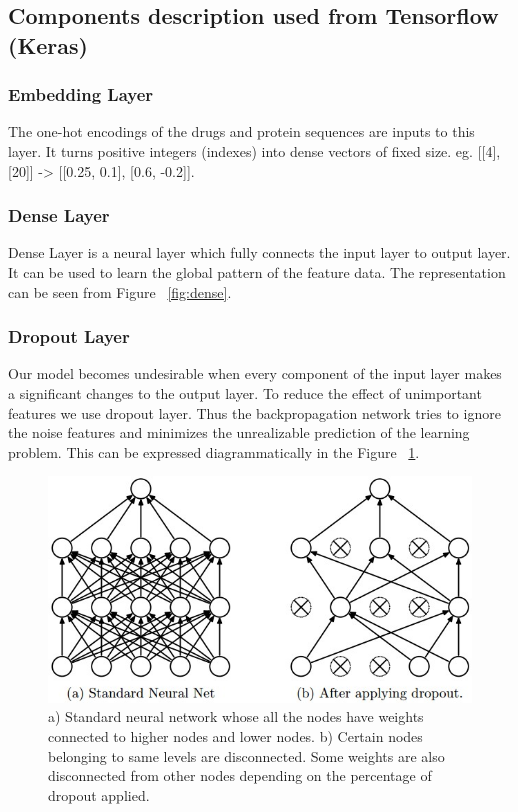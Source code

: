   \subsection{Components description used from Tensorflow (Keras)}
  \subsubsection{Embedding Layer}
  The one-hot encodings of the drugs and protein sequences are inputs to this layer. It turns positive integers (indexes) into dense vectors of fixed size. eg. [[4], [20]] -> [[0.25, 0.1], [0.6, -0.2]].
  
  \subsubsection{Dense Layer}
  Dense Layer is a neural layer which fully connects the input layer to output layer. It can be used to learn the global pattern of the feature data. The representation can be seen from Figure ~\ref{fig:dense}.
  
  
  \subsubsection{Dropout Layer}
  Our model becomes undesirable when every component of the input layer makes a significant changes to the output layer. To reduce the effect of unimportant features we use dropout layer. Thus the backpropagation network tries to ignore the noise features and minimizes the unrealizable prediction of the learning problem. This can be expressed diagrammatically in the Figure ~\ref{fig:dropout}.
  \begin{figure}
    [ht] \centering
    \includegraphics[width=.5\linewidth]{mainmatter/3-Methodology/images/dropout.jpeg}
    \caption[Dropout Layer]{a) Standard neural network whose all the nodes have weights connected to higher nodes and lower nodes. b) Certain nodes belonging to same levels are disconnected. Some weights are also disconnected from other nodes depending on the percentage of dropout applied.}
    \label{fig:dropout}
  
  \end{figure}
  
